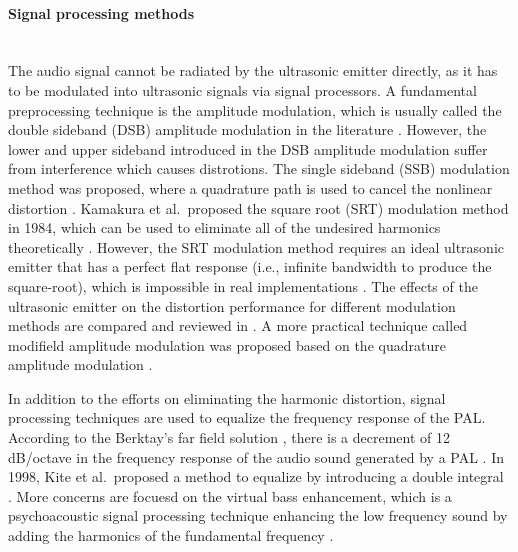 \paragraph{Signal processing methods}\mbox{}\\
The audio signal cannot be radiated by the ultrasonic emitter directly, {as} it has to be modulated into ultrasonic signals via signal processors.
A fundamental preprocessing technique is the amplitude modulation, which is usually called the double sideband (DSB) amplitude modulation in {the literature} \cite{Yoneyama1983AudioSpotlightApplication}.
However, the lower and upper sideband introduced in the DSB amplitude modulation suffer from interference which causes distrotions. 
The single sideband (SSB) modulation method was proposed, where a quadrature path is used to cancel the nonlinear distortion \cite{Aoki1991ParametricLoudspeakerCharacteristics}. 
Kamakura et al.\ proposed the square root (SRT) modulation method in 1984, which can be used to eliminate all of the undesired harmonics theoretically \cite{Kamakura1984DevelopmentsParametricLoudspeaker}.
However, the SRT modulation method requires an ideal ultrasonic emitter that has a perfect flat response (i.e., infinite bandwidth to produce the square-root), which is impossible in real implementations \cite{Shi2016EffectUltrasonicEmitter}.
The effects of the ultrasonic emitter on the distortion performance for different modulation methods {are} compared and reviewed in \cite{Shi2016EffectUltrasonicEmitter}.
A more practical technique called modifield amplitude modulation was proposed based on the quadrature amplitude modulation \cite{Gan2008DistortionAnalysisReduction, Tan2010PreprocessingTechniquesBandlimited, Ji2010TheoreticalExperimentalComparison, Tan2010PreprocessingTechniquesBandlimited}.

In addition to the efforts on eliminating the harmonic distortion, 
signal processing techniques are used to equalize the frequency response of the PAL.
According to the Berktay's far field solution \cite{Berktay1965PossibleExploitationNonlinear}, there is a decrement of 12 dB/octave in the frequency response of the audio sound generated by a PAL \cite{Yoneyama1983AudioSpotlightApplication}.
In 1998, Kite et al.\ proposed a method to equalize by introducing a double integral \cite{Kite1998ParametricArrayAir}.
More concerns are focuesd on the virtual bass enhancement, which is a psychoacoustic signal processing technique enhancing the low frequency sound by adding the harmonics of the fundamental frequency \cite{Arora2006LowComplexityVirtual, Karnapi2002MethodEnhanceLow, Gan2010AudioProjectionDirectional, Shi2013PsychoacousticalPreprocessingTechnique}. 

